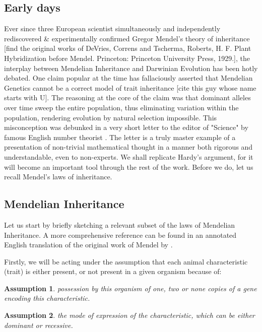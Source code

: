 \documentclass{l4proj}
\newtheorem{assum}{Assumption}
\begin{document}
\subsection{Early days}
Ever since three European scientist simultaneously and independently rediscovered \& experimentally confirmed Gregor Mendel's theory of inheritance [find the original works of DeVries, Correns and Tscherma, Roberts, H. F. Plant Hybridization before Mendel. Princeton: Princeton University Press, 1929.], the interplay between Mendelian Inheritance and Darwinian Evolution has been hotly debated. One claim popular at the time has fallaciously asserted that Mendelian Genetics cannot be a correct model of trait inheritance [cite this guy whose name starts with U]. The reasoning at the core of the claim was that dominant alleles over time sweep the entire population, thus eliminating variation within the population, rendering evolution by natural selection impossible. This misconception was debunked in a very short letter to the editor of "Science" by famous English number theorist \cite{hardy08}. The letter is a truly master example of a presentation of non-trivial mathematical thought in a manner both rigorous and understandable, even to non-experts. We shall replicate Hardy's argument, for it will become an important tool through the rest of the work. Before we do, let us recall Mendel's laws of inheritance.

\subsection{Mendelian Inheritance}

Let us start by briefly sketching a relevant subset of the laws of Mendelian Inheritance. A more comprehensive reference can be found in an annotated English translation of the original work of Mendel by \cite{mendel}.

Firstly, we will be acting under the assumption that each animal characteristic (trait) is either present, or not present in a given organism because of:
\begin{assum}\label{genotypes}
  possession by this organism of one, two or none copies of a gene encoding this characteristic.
\end{assum}

\begin{assum}\label{dominance}
  the mode of expression of the characteristic, which can be either dominant or recessive.
\end{assum}
\end{document}

